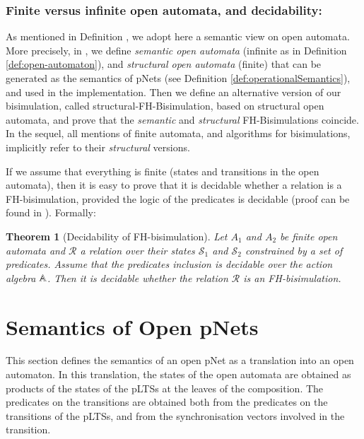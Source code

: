 \documentclass{elsarticle}
\newtheorem{thm}{Theorem}
\begin{document}
\subsubsection*{Finite versus infinite open automata, and decidability:} 
As mentioned in Definition \pageref{def:open-automaton}, we adopt here a semantic view on open automata. More precisely, in \cite{hou:hal-02406098}, we  define
\emph{semantic open automata} (infinite as in Definition \ref{def:open-automaton}),
and \emph{structural open automata} (finite) that can be generated as
the semantics of pNets (see Definition \ref{def:operationalSemantics}), and used in the implementation. Then we define
an alternative version of our bisimulation, called
structural-FH-Bisimulation, based on structural open automata, and
prove that the \emph{semantic} and \emph{structural} FH-Bisimulations coincide.
In the sequel, all mentions of finite automata, and algorithms for
bisimulations, implicitly refer to their \emph{structural} versions.

If we assume that everything is finite (states and transitions in the
open automata), then it is easy to
prove that it is decidable whether a relation is a 
FH-bisimulation, provided the logic of the predicates is
decidable (proof can be found in \cite{henrio:Forte2016}). Formally:

\begin{thm}[Decidability of FH-bisimulation]
Let $A_1$ and $A_2$ be finite open automata
and $\mathcal{R}$ a relation over their states $\mathcal{S}_1$ and
$\mathcal{S}_2$ constrained by a set of predicates. Assume that
the predicates inclusion is decidable over  
the action algebra $\mathbb{A}$. Then it is decidable whether the relation 
$\mathcal{R}$ is an FH-bisimulation.
  
\end{thm}



\section{Semantics of Open pNets}
\label{section:op-semantics}

This section defines the semantics of an open pNet as a translation into an open automaton. 
In this translation, the states of the open automata are obtained as products of 
the states of the pLTSs at the leaves of the composition. The
predicates on the transitions are obtained both from the predicates on
the transitions of the pLTSs, and from the synchronisation vectors involved in
the transition. 
\end{document}
